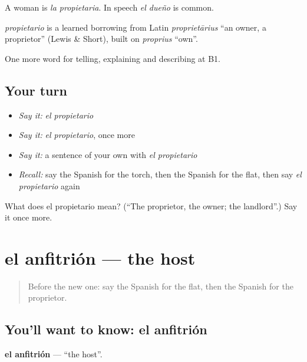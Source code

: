 A woman is \emph{la propietaria}. In speech \emph{el dueño} is common.

\begin{cousinweb}
\emph{propietario} is a learned borrowing from Latin \emph{proprietārius} \textquotedblleft{}an owner, a proprietor\textquotedblright{} (Lewis \& Short), built on \emph{proprius} \textquotedblleft{}own\textquotedblright{}.
\end{cousinweb}

\begin{grammarlens}[title={What you've built}]
One more word for telling, explaining and describing at B1.
\end{grammarlens}

\subsection*{Your turn}
\begin{itemize}
\raggedright
  \item \emph{Say it:} \emph{el propietario}
  \item \emph{Say it:} \emph{el propietario}, once more
  \item \emph{Say it:} a sentence of your own with \emph{el propietario}
  \item \emph{Recall:} say the Spanish for the torch, then the Spanish for the flat, then say \emph{el propietario} again
\end{itemize}

\begin{tcolorbox}[breakable,colback=teal!4,colframe=teal!35!black,title={Before you move on}]
What does el propietario mean? (\textquotedblleft{}The proprietor, the owner; the landlord\textquotedblright{}.) Say it once more.
\end{tcolorbox}
\section[el anfitrión]{el anfitrión — the host}

\label{lesson:ES-C667-anfitrion}



\begin{quote}
Before the new one: say the Spanish for the flat, then the Spanish for the proprietor.
\end{quote}

\subsection*{You'll want to know: el anfitrión}
\textbf{el anfitrión} — \textquotedblleft{}the host\textquotedblright{}.

